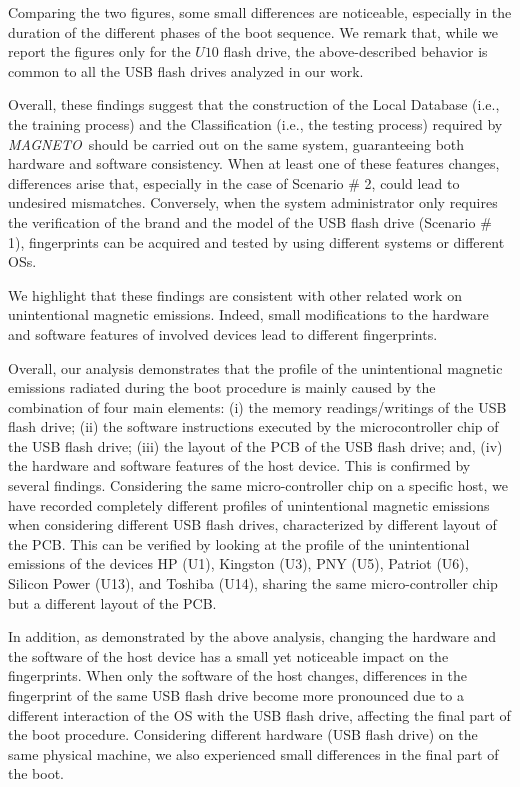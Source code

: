 \documentclass[acmsmall, authorversion]{acmart}
\newcommand{\sol}{\emph{MAGNETO}}
\begin{document}
Comparing the two figures, some small differences are noticeable, especially in the duration of the different phases of the boot sequence.
We remark that, while we report the figures only for the $U10$ flash drive, the above-described behavior is common to all the USB flash drives analyzed in our work.

Overall, these findings suggest that the construction of the Local Database (i.e., the training process) and the Classification (i.e., the testing process) required by \sol\ should be carried out on the same system, guaranteeing both hardware and software consistency. When at least one of these features changes, differences arise that, especially in the case of Scenario \# 2, could lead to undesired mismatches. Conversely, when the system administrator only requires the verification of the brand and the model of the USB flash drive (Scenario \# 1), fingerprints can be acquired and tested by using different systems or different OSs.

We highlight that these findings are consistent with other related work on unintentional magnetic emissions. Indeed, small modifications to the hardware and software features of involved devices lead to different fingerprints.

Overall, our analysis demonstrates that the profile of the unintentional magnetic emissions radiated during the boot procedure is mainly caused by the combination of four main elements: (i) the memory readings/writings of the USB flash drive; (ii) the software instructions executed by the microcontroller chip of the USB flash drive; (iii) the layout of the PCB of the USB flash drive; and, (iv) the hardware and software features of the host device. 
%
This is confirmed by several findings. Considering the same micro-controller chip on a specific host, we have recorded completely different profiles of unintentional magnetic emissions when considering different USB flash drives, characterized by different layout of the PCB. This can be verified by looking at the profile of the unintentional emissions of the devices HP (U1), Kingston (U3), PNY (U5), Patriot (U6), Silicon Power (U13), and Toshiba (U14), sharing the same micro-controller chip but a different layout of the PCB.

%
In addition, as demonstrated by the above analysis, changing the hardware and the software of the host device has a small yet noticeable impact on the fingerprints. When only the software of the host changes, differences in the fingerprint of the same USB flash drive become more pronounced due to a different interaction of the OS with the USB flash drive, affecting the final part of the boot procedure. Considering different hardware (USB flash drive) on the same physical machine, we also experienced small differences in the final part of the boot. 
\end{document}
